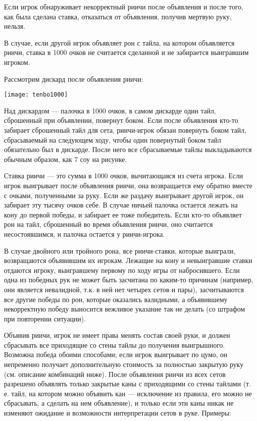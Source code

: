Если игрок обнаруживает некорректный риичи после объявления и после того, как была сделана ставка, отказаться от объявления, получив мертвую руку, нельзя.

В случае, если другой игрок объявляет рон с тайла, на котором объявляется риичи, ставка в 1000 очков не считается сделанной и не забирается выигравшим игроком.

Рассмотрим дискард после объявления риичи:

\hspace{1.3cm} \texttt{[image: tenbo1000]}



Над дискардом --- палочка в 1000 очков, в самом дискарде один тайл, сброшенный при объявлении, повернут боком. Если после объявления кто-то забирает сброшенный тайл для сета, риичи-игрок обязан повернуть боком тайл, сбрасываемый на следующем ходу, чтобы один повернутый боком тайл обязательно был в дискарде. После него все сбрасываемые тайлы выкладываются обычным образом, как 7 соу на рисунке.

Ставка риичи --- это сумма в 1000 очков, вычитающаяся из счета игрока. Если игрок выигрывает после объявления риичи, она возвращается ему обратно вместе с очками, полученными за руку. Если же раздачу выигрывает другой игрок, он забирает эту тысячу очков себе. В случае ничьей палочка остается лежать на кону до первой победы, и забирает ее тоже победитель. Если кто-то объявляет рон на тайл, сброшенный во время объявления риичи, оно считается несостоявшимся, и палочка остается у риичи-игрока.

В случае двойного или тройного рона, все риичи-ставки, которые выиграли, возвращаются объявившим их игрокам. Лежащие на кону и невыигравшие ставки отдаются игроку, выигравшему первому по ходу игры от набросившего. Если одна из победных рук не может быть засчитана по каким-то причинам (например, они является невалидной, т.к. в ней нет четырех сетов и пары), засчитываются все другие победы по рон, которые оказались валидными, а объявившему некорректную победу выносится вежливое указание так не делать (со штрафом при повторении ситуации).

Объявив риичи, игрок не имеет права менять состав своей руки, и должен сбрасывать все приходящие со стены тайлы до получения выигрышного. Возможна победа обоими способами; если игрок выигрывает по цумо, он непременно получает дополнительную стоимость за полностью закрытую руку (см. описание комбинаций ниже). После объявления риичи из всех сетов разрешено объявлять только закрытые каны с приходящими со стены тайлами (т. е. тайл, на котором можно объявить кан --- исключение из правила, его можно не сбрасывать, а сделать на нем объявление), и только если эти каны никак не изменяют ожидание и возможности интерпретации сетов в руке. Примеры:

